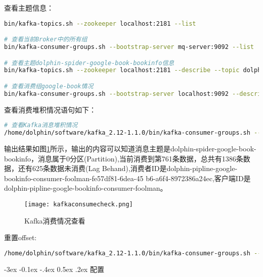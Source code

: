 \documentclass[8pt]{book}
\makeatletter
\numberwithin{dummy}{section}
\theoremstyle{ocrenumbox}
\theoremstyle{blacknumex}
\theoremstyle{blacknumbox}
\theoremstyle{ocrenum}
\renewcommand{\subsection}{\@startsection {subsection}{2}{\z@}
	{-3ex \@plus -0.1ex \@minus -.4ex}
	{0.5ex \@plus.2ex }
	{\normalfont\sffamily\bfseries}}
\makeatother
\begin{document}
查看主题信息：

\begin{lstlisting}[language=Bash]
bin/kafka-topics.sh --zookeeper localhost:2181 --list

# 查看当前Broker中的所有组
bin/kafka-consumer-groups.sh --bootstrap-server mq-server:9092 --list

# 查看主题dolphin-spider-google-book-bookinfo信息
bin/kafka-topics.sh --zookeeper localhost:2181 --describe --topic dolphin-spider-google-book-bookinfo

# 查看消费组google-book情况
bin/kafka-consumer-groups.sh --bootstrap-server localhost:9092 --describe --group google-book
\end{lstlisting}

查看消费堆积情况语句如下：

\begin{lstlisting}[language=Bash]
# 查看Kafka消息堆积情况
/home/dolphin/software/kafka_2.12-1.1.0/bin/kafka-consumer-groups.sh --bootstrap-server mq-server:9092 --group google-book --describe
\end{lstlisting}

输出结果如图\ref{fig:kafkaconsumecheck}所示，输出的内容可以知道消息主题是dolphin-spider-google-book-bookinfo，消息属于0分区(Partition),当前消费到第761条数据，总共有1386条数据，还有625条数据未消费(Lag Behand),消费者ID是dolphin-pipline-google-bookinfo-consumer-foolman-fe57df81-6dea-45                                                                    b6-a6f4-8972386a24ec,客户端ID是dolphin-pipline-google-bookinfo-consumer-foolman。

\begin{figure}[htbp]
	\centering
	\texttt{[image: kafkaconsumecheck.png]}
	\caption{Kafka消费情况查看}
	\label{fig:kafkaconsumecheck}
\end{figure}

重置offset:

\begin{lstlisting}[language=Bash]
/home/dolphin/software/kafka_2.12-1.1.0/bin/kafka-consumer-groups.sh --bootstrap-server mq-server:9092 --group google-book --topic dolphin-spider-google-book-bookinfo --reset-offsets --to-earliest --execute
\end{lstlisting}




\subsection{配置}
\end{document}
